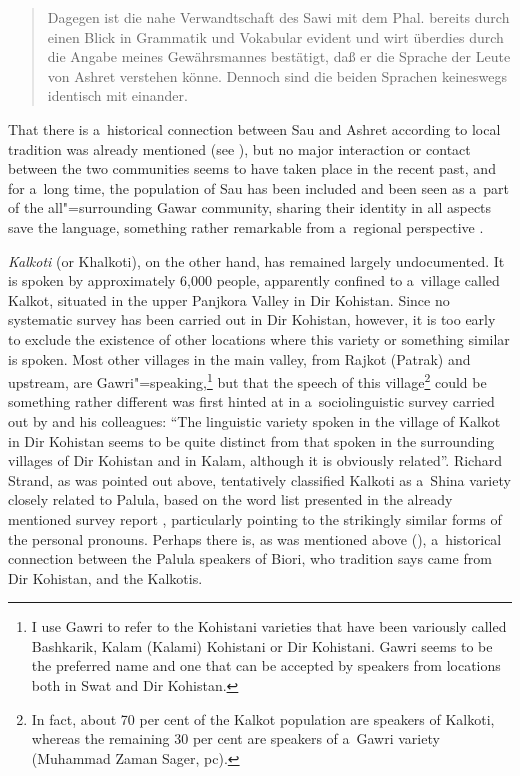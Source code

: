\begin{quote}
Dagegen ist die nahe Verwandtschaft des Sawi mit dem Phal. bereits durch einen Blick in Grammatik und Vokabular evident und wirt überdies durch die Angabe meines Gewährsmannes bestätigt, daß er die Sprache der Leute von Ashret verstehen könne. Dennoch sind die beiden Sprachen keineswegs identisch mit einander. \citep[11]{buddruss1967}
\end{quote}


That there is a~historical connection between Sau and Ashret according to local tradition was
already mentioned (see ), but no major interaction or
contact between the two communities seems to have taken place in the recent past, and for a~long
time, the population of Sau has been included and been seen as a~part of the all"=surrounding Gawar
community, sharing their identity in all aspects save the language, something rather remarkable from
a~regional perspective \citep[232]{cacopardo2001}.


\textit{Kalkoti} (or Khalkoti), on the other hand, has remained largely undocumented. It is spoken by approximately 6,000 people, apparently confined to a~village called Kalkot, situated in the upper Panjkora Valley in Dir Kohistan. Since no systematic survey has been carried out in Dir Kohistan, however, it is too early to exclude the existence of other locations where this variety or something similar is spoken. Most other villages in the main valley, from Rajkot (Patrak) and upstream, are Gawri"=speaking,\footnote{I use Gawri to refer to the Kohistani varieties that have been variously called Bashkarik, Kalam (Kalami) Kohistani or Dir Kohistani. Gawri seems to be the preferred name and one that can be accepted by speakers from locations both in Swat and Dir Kohistan.} but that the speech of this village\footnote{In fact, about 70 per cent of the Kalkot population are speakers of Kalkoti, whereas the remaining 30 per cent are speakers of a~Gawri variety (Muhammad Zaman Sager, pc).} could be something rather different was first hinted at in a~sociolinguistic survey carried out by \citet[7]{rensch1992} and his colleagues: ``The linguistic variety spoken in the village of Kalkot in Dir Kohistan seems to be quite distinct from that spoken in the surrounding villages of Dir Kohistan and in Kalam, although it is obviously related''. Richard Strand, as was pointed out above, tentatively classified Kalkoti as a~Shina variety closely related to Palula, based on the word list presented in the already mentioned survey report \citep[159--176]{rensch1992}, particularly pointing to the strikingly similar forms of the personal pronouns. Perhaps there is, as was mentioned above (), a~historical connection between the Palula speakers of Biori, who tradition says came from Dir Kohistan, and the Kalkotis.


